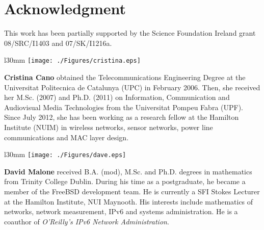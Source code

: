 \documentclass[preprint,12pt]{elsarticle}
\begin{document}
\section*{Acknowledgment}

This work has been partially supported by the Science Foundation Ireland grant 08/SRC/I1403 and 07/SK/I1216a.




\vspace{1cm}

\begin{wrapfigure}{l}{30mm}
    \texttt{[image: ./Figures/cristina.eps]}
\end{wrapfigure}
\textbf{Cristina Cano} obtained the Telecommunications Engineering Degree at the Universitat Politecnica de Catalunya (UPC) in February 2006. Then, she received her M.Sc. (2007) and Ph.D. (2011) on Information, Communication and Audiovisual Media Technologies from the Universitat Pompeu Fabra (UPF). Since July 2012, she has been working as a research fellow at the Hamilton Institute (NUIM) in wireless networks, sensor networks, power line communications and MAC layer design.\\


\begin{wrapfigure}{l}{30mm}
    \texttt{[image: ./Figures/dave.eps]}
\end{wrapfigure}
\textbf{David Malone} received B.A. (mod), M.Sc. and Ph.D. degrees in mathematics from Trinity College Dublin. During his time as a postgraduate, he became a member of the FreeBSD development team. He is currently a SFI Stokes Lecturer at the Hamilton Institute, NUI Maynooth. His interests include mathematics of networks, network measurement, IPv6 and systems administration. He is a coauthor of \emph{O'Reilly's IPv6 Network Administration}.
\end{document}
